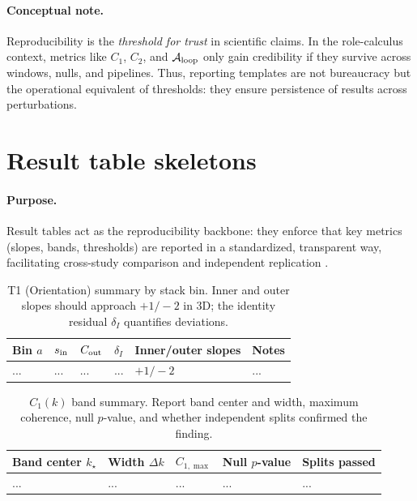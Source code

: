 \documentclass[12pt,a4paper,oneside]{scrreprt}
\begin{document}
\paragraph{Conceptual note.}  
Reproducibility is the \emph{threshold for trust} in scientific claims.  
In the role-calculus context, metrics like $C_1$, $C_2$, and $\mathcal A_{\rm loop}$ only gain credibility if they survive across windows, nulls, and pipelines.  
Thus, reporting templates are not bureaucracy but the operational equivalent of thresholds: they ensure persistence of results across perturbations.

\section*{Result table skeletons}

\paragraph{Purpose.}
Result tables act as the reproducibility backbone: they enforce that key metrics (slopes, bands, thresholds) are reported in a standardized, transparent way, facilitating cross-study comparison and independent replication \cite{Peng2011,Stodden2016}.

\begin{table}[htbp]\centering
\caption{T1 (Orientation) summary by stack bin. Inner and outer slopes should approach $+1/-2$ in 3D; the identity residual $\delta_I$ quantifies deviations.}
\begin{tabular}{llllll}\toprule
Bin $a$ & $s_{\rm in}$ & $C_{\rm out}$ & $\delta_I$ & Inner/outer slopes & Notes \\\midrule
... & ... & ... & ... & $+1 / -2$ & ...\\ \bottomrule
\end{tabular}
\end{table}

\begin{table}[htbp]\centering
\caption{$C_1(k)$ band summary. Report band center and width, maximum coherence, null $p$-value, and whether independent splits confirmed the finding.}
\begin{tabular}{lllll}\toprule
Band center $k_\star$ & Width $\Delta k$ & $C_{1,\max}$ & Null $p$-value & Splits passed \\\midrule
... & ... & ... & ... & ...\\ \bottomrule
\end{tabular}
\end{table}
\end{document}
